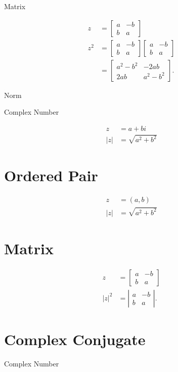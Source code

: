 \documentclass[10pt]{article}
\begin{document}
Matrix

$$
\begin{aligned}
z & =\left[\begin{array}{cc}
a & -b \\
b & a
\end{array}\right] \\
z^{2} & =\left[\begin{array}{cc}
a & -b \\
b & a
\end{array}\right]\left[\begin{array}{cc}
a & -b \\
b & a
\end{array}\right] \\
& =\left[\begin{array}{cc}
a^{2}-b^{2} & -2 a b \\
2 a b & a^{2}-b^{2}
\end{array}\right] .
\end{aligned}
$$

Norm

Complex Number

$$
\begin{aligned}
z & =a+b i \\
|z| & =\sqrt{a^{2}+b^{2}}
\end{aligned}
$$

\section{Ordered Pair}
$$
\begin{aligned}
z & =(a, b) \\
|z| & =\sqrt{a^{2}+b^{2}}
\end{aligned}
$$

\section{Matrix}
$$
\begin{aligned}
z & =\left[\begin{array}{cc}
a & -b \\
b & a
\end{array}\right] \\
|z|^{2} & =\left|\begin{array}{cc}
a & -b \\
b & a
\end{array}\right| .
\end{aligned}
$$

\section{Complex Conjugate}
Complex Number
\end{document}
